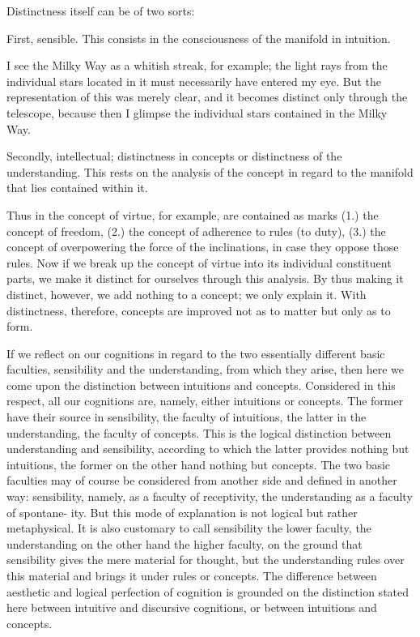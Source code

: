 Distinctness itself can be of two sorts:

First, sensible.
This consists in the consciousness of the manifold in intuition.

I see the Milky Way as a whitish streak, for example;
the light rays from the individual stars located in it
must necessarily have entered my eye.
But the representation of this was merely clear,
and it becomes distinct only through the telescope,
because then I glimpse the individual stars contained in the Milky Way.

Secondly, intellectual;
distinctness in concepts or distinctness of the understanding.
This rests on the analysis of the concept in regard to
the manifold that lies contained within it.

Thus in the concept of virtue, for example, are contained as marks
(1.) the concept of freedom,
(2.) the concept of adherence to rules (to duty),
(3.) the concept of overpowering the force of the inclinations,
in case they oppose those rules.
Now if we break up the concept of virtue into its individual constituent parts,
we make it distinct for ourselves through this analysis.
By thus making it distinct, however, we add nothing to a concept; we only explain it.
With distinctness, therefore, concepts are improved not as to matter but only as to form.

If we reflect on our cognitions in regard to the two essentially different
basic faculties, sensibility and the understanding, from which they arise,
then here we come upon the distinction between intuitions and concepts.
Considered in this respect, all our cognitions are, namely, either intuitions
or concepts. The former have their source in sensibility, the faculty of
intuitions, the latter in the understanding, the faculty of concepts. This is
the logical distinction between understanding and sensibility, according to
which the latter provides nothing but intuitions, the former on the other
hand nothing but concepts. The two basic faculties may of course be
considered from another side and defined in another way: sensibility,
namely, as a faculty of receptivity, the understanding as a faculty of spontane-
ity. But this mode of explanation is not logical but rather metaphysical. It is
also customary to call sensibility the lower faculty, the understanding on
the other hand the higher faculty, on the ground that sensibility gives the
mere material for thought, but the understanding rules over this material
and brings it under rules or concepts.
The difference between aesthetic and logical perfection of cognition is
grounded on the distinction stated here between intuitive and discursive
cognitions, or between intuitions and concepts.

